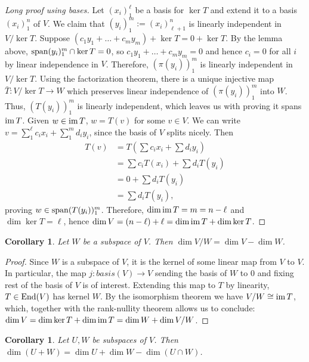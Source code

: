 \documentclass[12pt]{article}
\theoremstyle{definition}
\theoremstyle{plain}
\newtheorem{corollary}[theorem]{Corollary}
\numberwithin{equation}{section}
\theoremstyle{definition}
\begin{document}
\begin{proof}[Long proof using bases]
Let $ (x_i)_1^\ell $ be a basis for $ \ker T $ and extend it to a basis $ (x_i)_1^n$ of $ V $. We claim that $ (y_i)_1^m := (x_i)_{\ell+1}^n $ is linearly independent in $ V / \ker T $. Suppose $ (c_1 y_1 + \ldots + c_m y_m) + \ker T = 0 + \ker T $. By the lemma above, $ \operatorname{span} (y_i)_1^m \cap \ker T = 0$, so $ c_1 y_1 + \ldots + c_m y_m =0 $ and hence $ c_i =0 $ for all $ i $ by linear independence in $ V $. Therefore, $ (\pi(y_i))_1^m $ is linearly independent in $ V / \ker T $. Using the factorization theorem, there is a unique injective map $ \bar{T} : V / \ker T \to W $ which preserves linear independence of $ (\pi(y_i))_1^m $ into $ W $. Thus, $ (T(y_i))_1^m $ is linearly independent, which leaves us with proving it spans $ \operatorname{im} T $. Given $ w \in \operatorname{im} T $, $ w = T(v) $ for some $ v \in V $. We can write $ v = \sum_1^\ell c_i x_i + \sum_1^m d_i y_i$, since the basis of $ V $ splits nicely. Then
\begin{align*}
	T(v) &= T(\sum c_i x_i + \sum d_i y_i)\\
	&= \sum c_i T(x_i) + \sum d_i T(y_i)\\
	&= 0 + \sum d_i T(y_i)\\
	&= \sum d_i T(y_i),
\end{align*}
proving $ w \in \operatorname{span} (T(y_i))_1^m $. Therefore, $ \dim \operatorname{im} T = m = n - \ell $ and $ \dim \ker T = \ell $, hence $ \dim V = (n - \ell) + \ell = \dim \operatorname{im} T + \dim \ker T $.
\end{proof}

\begin{corollary} \label{rn_cor}
Let $ W $ be a subspace of $ V $. Then $ \dim V / W = \dim V - \dim W $.
\end{corollary}

\begin{proof}
Since $ W $ is a subspace of $ V $, it is the kernel of some linear map from $ V $ to $ V $. In particular, the map $ j : basis(V) \to V $ sending the basis of $ W $ to $ 0 $ and fixing rest of the basis of $ V $ is of interest. Extending this map to $ T $ by linearity, $ T \in \operatorname{End}(V)$ has kernel $ W $. By the isomorphism theorem we have $ V / W \cong \operatorname{im} T $, which, together with the rank-nullity theorem allows us to conclude: $ \dim V = \dim \ker T + \dim \operatorname{im} T = \dim W + \dim V / W$.
\end{proof}

\begin{corollary}
Let $ U, W $ be subspaces of $ V$. Then $ \dim(U + W) = \dim U + \dim W - \dim (U \cap W) $.
\end{corollary}
\end{document}
